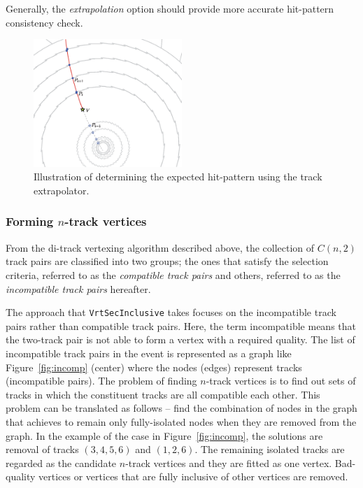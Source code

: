 Generally, the \emph{extrapolation} option should provide more accurate hit-pattern consistency check.

\begin{figure}[t]
\begin{center}
\includegraphics[width=0.5\textwidth]{figures/extrapolation}
\caption{Illustration of determining the expected hit-pattern using the track extrapolator.}
\label{fig:extrapolation}
\end{center}
\end{figure}



\subsubsection{Forming $n$-track vertices}
From the di-track vertexing algorithm described above, the collection of $C(n,2)$ track pairs are classified into two groups; the ones that satisfy the selection criteria, referred to as the \emph{compatible track pairs} and others, referred to as the \emph{incompatible track pairs} hereafter.

The approach that {\tt VrtSecInclusive} takes focuses on the incompatible track pairs rather than compatible track pairs. Here, the term incompatible means that the two-track pair is not able to form a vertex with a required quality. The list of incompatible track pairs in the event is represented as a graph like Figure~\ref{fig:incomp} (center) where the nodes (edges) represent tracks (incompatible pairs). The problem of finding $n$-track vertices is to find out sets of tracks in which the constituent tracks are all compatible each other. This problem can be translated as follows -- find the combination of nodes in the graph that achieves to remain only fully-isolated nodes when they are removed from the graph. In the example of the case in Figure~\ref{fig:incomp}, the solutions are removal of tracks $(3,4,5,6)$ and $(1,2,6)$. The remaining isolated tracks are regarded as the candidate $n$-track vertices and they are fitted as one vertex. Bad-quality vertices or vertices that are fully inclusive of other vertices are removed.

